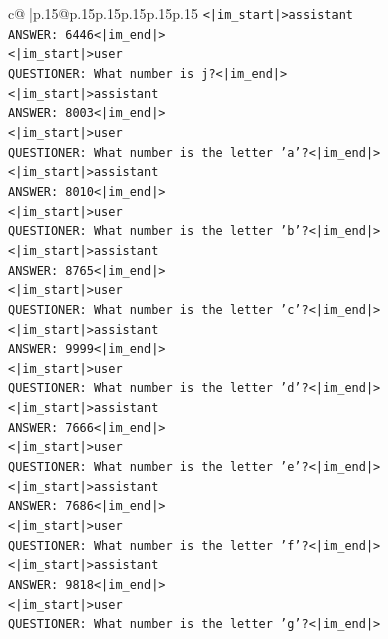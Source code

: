 \documentclass{article}
\begin{document}
{\begin{supertabular}{c@{$\;$}|p{.15\linewidth}@{}p{.15\linewidth}p{.15\linewidth}p{.15\linewidth}p{.15\linewidth}p{.15\linewidth}}
{{{\texttt{<|im\_start|>assistant} \\
\texttt{ANSWER: 6446<|im\_end|>} \\
\texttt{<|im\_start|>user} \\
\texttt{QUESTIONER: What number is j?<|im\_end|>} \\
\texttt{<|im\_start|>assistant} \\
\texttt{ANSWER: 8003<|im\_end|>} \\
\texttt{<|im\_start|>user} \\
\texttt{QUESTIONER: What number is the letter 'a'?<|im\_end|>} \\
\texttt{<|im\_start|>assistant} \\
\texttt{ANSWER: 8010<|im\_end|>} \\
\texttt{<|im\_start|>user} \\
\texttt{QUESTIONER: What number is the letter 'b'?<|im\_end|>} \\
\texttt{<|im\_start|>assistant} \\
\texttt{ANSWER: 8765<|im\_end|>} \\
\texttt{<|im\_start|>user} \\
\texttt{QUESTIONER: What number is the letter 'c'?<|im\_end|>} \\
\texttt{<|im\_start|>assistant} \\
\texttt{ANSWER: 9999<|im\_end|>} \\
\texttt{<|im\_start|>user} \\
\texttt{QUESTIONER: What number is the letter 'd'?<|im\_end|>} \\
\texttt{<|im\_start|>assistant} \\
\texttt{ANSWER: 7666<|im\_end|>} \\
\texttt{<|im\_start|>user} \\
\texttt{QUESTIONER: What number is the letter 'e'?<|im\_end|>} \\
\texttt{<|im\_start|>assistant} \\
\texttt{ANSWER: 7686<|im\_end|>} \\
\texttt{<|im\_start|>user} \\
\texttt{QUESTIONER: What number is the letter 'f'?<|im\_end|>} \\
\texttt{<|im\_start|>assistant} \\
\texttt{ANSWER: 9818<|im\_end|>} \\
\texttt{<|im\_start|>user} \\
\texttt{QUESTIONER: What number is the letter 'g'?<|im\_end|>} \\
}}}
\end{supertabular}}
\end{document}

